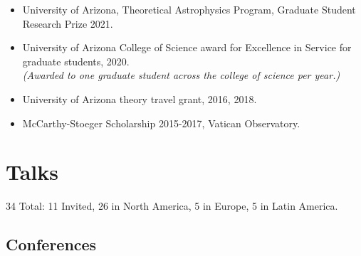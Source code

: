 \documentclass[UTF8]{article}
\begin{document}
\begin{itemize}
  \setlength\itemsep{0.0em}
  \renewcommand\labelitemi{$\cdot$}

\item University of Arizona, Theoretical Astrophysics Program, Graduate Student
Research Prize 2021.
\item University of Arizona College of Science award for Excellence in
Service for graduate students, 2020.\\ 
\indent \textit{(Awarded to one graduate student across the college of
science per year.)}
\item University of Arizona theory travel grant, 2016, 2018. 
\item McCarthy-Stoeger Scholarship 2015-2017, Vatican Observatory.
\end{itemize}
\section*{Talks}

34 Total: 11 Invited, 26 in North America, 5 in Europe, 5 in Latin America.\\


\subsection*{Conferences}
\end{document}
